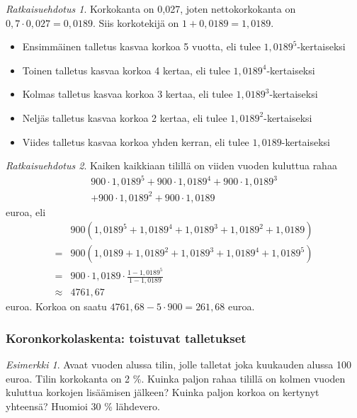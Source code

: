 \documentclass[handout]{beamer}\usepackage[]{graphicx}\usepackage[]{color}
\theoremstyle{remark}
\newtheorem{esim}{Esimerkki}
\newtheorem{ratkaisu}{Ratkaisuehdotus}
\begin{document}
\begin{frame}
	\begin{ratkaisu}
		\pause 
    Korkokanta on 0,027, joten nettokorkokanta on \(0,7\cdot0,027 = 0,0189\). \pause
		Siis korkotekijä on \(1+0,0189 =	1,0189\). \pause
		\begin{itemize}
		    \item Ensimmäinen talletus kasvaa korkoa 5 vuotta, eli tulee \(1,0189^5\)-kertaiseksi\pause
		    \item Toinen talletus kasvaa korkoa 4 kertaa, eli tulee \(1,0189^4\)-kertaiseksi\pause
		    \item Kolmas talletus kasvaa korkoa 3 kertaa, eli tulee \(1,0189^3\)-kertaiseksi\pause
		    \item Neljäs talletus kasvaa korkoa 2 kertaa, eli tulee \(1,0189^2\)-kertaiseksi\pause
		    \item Viides talletus kasvaa korkoa yhden kerran, eli tulee \(1,0189\)-kertaiseksi
		\end{itemize}
	\end{ratkaisu}
\end{frame}


\begin{frame}
    \begin{ratkaisu}
        Kaiken kaikkiaan tilillä on viiden vuoden kuluttua rahaa
        \begin{multline*}
            900\cdot1,0189^5 + 900\cdot1,0189^4 + 900\cdot1,0189^3\\
             +900\cdot1,0189^2 + 900\cdot1,0189
        \end{multline*}
        euroa, eli\pause
        \begin{align*}
            &900(1,0189^5 + 1,0189^4 + 1,0189^3 + 1,0189^2 + 1,0189)\\
            =&900(1,0189 + 1,0189^2 + 1,0189^3 + 1,0189^4 + 1,0189^5)\\
            =&900\cdot1,0189\cdot\frac{1-1,0189^5}{1-1,0189}\\
            \approx & 4761,67
        \end{align*}
        euroa. \pause Korkoa on saatu \(4761,68-5\cdot900 = 261,68\) euroa.
    \end{ratkaisu}
\end{frame}

\begin{frame}
    \frametitle{Koronkorkolaskenta: toistuvat talletukset}
    \pause
    \begin{esim}
        Avaat vuoden alussa tilin, jolle talletat joka kuukauden alussa 100 euroa.
        Tilin korkokanta on 2 \%. Kuinka paljon rahaa tilillä on kolmen vuoden kuluttua korkojen lisäämisen jälkeen?
        Kuinka paljon korkoa on kertynyt yhteensä? Huomioi 30 \% lähdevero.
    \end{esim}
\end{frame}
\end{document}
